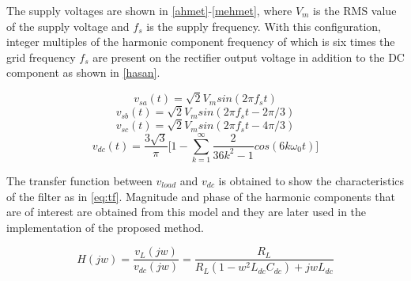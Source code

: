 \documentclass[conference,a4paper,twocolumn]{IEEEtran}
\begin{document}
The supply voltages are shown in \ref{ahmet}-\ref{mehmet}, where $V_m$ is the RMS value of the supply voltage and $f_s$ is the supply frequency. With this configuration, integer multiples of the harmonic component frequency of which is six times the grid frequency $f_s$ are present on the rectifier output voltage in addition to the DC component as shown in \ref{hasan}. 

\begin{equation} \label{ahmet}
v_{sa}(t) = \sqrt{2}V_msin(2\pi f_s t)
\end{equation}
\begin{equation} \label{eq:2}
v_{sb}(t) = \sqrt{2}V_msin(2\pi f_s t-2\pi/3)
\end{equation}
\begin{equation} \label{mehmet}
v_{sc}(t) = \sqrt{2}V_msin(2\pi f_s t-4\pi/3)
\end{equation}
\begin{equation} \label{hasan}
v_{dc}(t) = \frac{3\sqrt{3}}{\pi} \bigg[1-\sum_{k=1}^{\infty} \frac{2}{36k^2-1}cos(6k\omega_{0}t)\bigg] 
\end{equation}

The transfer function between $v_{load}$ and $v_{dc}$ is obtained to show the characteristics of the filter as in \ref{eq:tf}. Magnitude and phase of the harmonic components that are of interest are obtained from this model and they are later used in the implementation of the proposed method.

\begin{equation} \label{eq:tf}
H(jw) = \frac{v_{L}(jw)}{v_{dc}(jw)} = \frac{R_{L}}{R_{L}(1-w^2L_{dc}C_{dc})+jwL_{dc}}
\end{equation}
\end{document}
